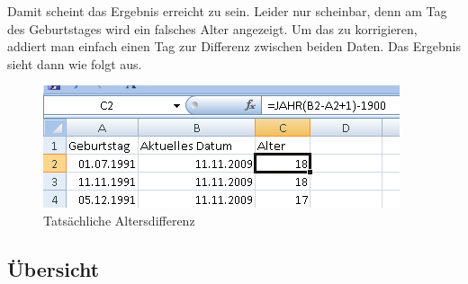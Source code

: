 Damit scheint das Ergebnis erreicht zu sein. Leider nur scheinbar, denn am Tag des Geburtstages wird ein falsches Alter angezeigt. Um das zu korrigieren, addiert man einfach einen Tag zur Differenz zwischen beiden Daten. Das Ergebnis sieht dann wie folgt aus.
	\begin{figure}[H]
		\centering
		\includegraphics{images/alter3.png}
		\caption{Tatsächliche Altersdifferenz}
		\label{fig:alter4}
	\end{figure}

\subsection{Übersicht}

